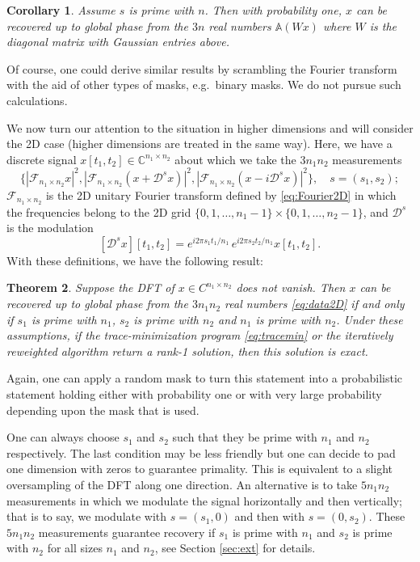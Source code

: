 \documentclass[11pt]{article}
\newtheorem{theorem}{Theorem}[section]
\newtheorem{corollary}[theorem]{Corollary}
\newcommand{\C}{\mathbb{C}}
\newcommand{\<}{\langle}
\renewcommand{\>}{\rangle}
\newcommand{\mapA}{\mathbb{A}}
\numberwithin{equation}{section}
\begin{document}
\begin{corollary}
  Assume $s$ is prime with $n$.  Then with probability one, $x$ can be
  recovered up to global phase from the $3n$ real numbers $\mapA(Wx)$
  where $W$ is the diagonal matrix with Gaussian entries above.
\end{corollary}
Of course, one could derive similar results by scrambling the Fourier
transform with the aid of other types of masks, e.g.~binary masks. We
do not pursue such calculations. 

\newcommand{\cF}{\mathcal{F}}

We now turn our attention to the situation in higher dimensions and
will consider the 2D case (higher dimensions are treated in the same
way). Here, we have a discrete signal $x[t_1, t_2] \in \C^{n_1 \times
  n_2}$ about which we take the $3n_1 n_2$ measurements
\begin{equation}
  \label{eq:data2D}
  \{|\cF_{n_1 \times n_2}  x|^2, |\cF_{n_1 \times n_2} (x + \mathcal{D}^s x)|^2, |\cF_{n_1 \times n_2} (x - i\mathcal{D}^s x)|^2\}, \quad s = (s_1, s_2); 
\end{equation}
$\cF_{n_1 \times n_2}$ is the 2D unitary Fourier transform defined by
\eqref{eq:Fourier2D} in which the frequencies belong to the 2D grid
$\{0, 1, \ldots, n_1 -1\} \times \{0, 1, \ldots, n_2 -1\}$, and
$\mathcal{D}^s$ is the modulation
$$
[\mathcal{D}^s x][t_1, t_2] = e^{i2\pi s_1 t_1/n_1} \, e^{i2\pi s_2
  t_2/n_1} x[t_1, t_2].
$$
With these definitions, we have the following result: 
\begin{theorem}
  \label{teo:2D}
  Suppose the DFT of $x \in C^{n_1 \times n_2}$ does not vanish. Then
  $x$ can be recovered up to global phase from the $3n_1 n_2$ real
  numbers \eqref{eq:data2D} if and only if $s_1$ is prime with $n_1$,
  $s_2$ is prime with $n_2$ and $n_1$ is prime with $n_2$. Under these
  assumptions, if the trace-minimization program \eqref{eq:tracemin}
  or the iteratively reweighted algorithm return a rank-1 solution,
  then this solution is exact.
\end{theorem}

Again, one can apply a random mask to turn this statement into a
probabilistic statement holding either with probability one or with
very large probability depending upon the mask that is used. 

One can always choose $s_1$ and $s_2$ such that they be prime with
$n_1$ and $n_2$ respectively. The last condition may be less friendly
but one can decide to pad one dimension with zeros to guarantee
primality. This is equivalent to a slight oversampling of the DFT
along one direction. An alternative is to take $5 n_1 n_2$
measurements in which we modulate the signal horizontally and then
vertically; that is to say, we modulate with $s = (s_1,0)$ and then
with $s = (0,s_2)$. These $5 n_1 n_2$ measurements guarantee recovery
if $s_1$ is prime with $n_1$ and $s_2$ is prime with $n_2$ for all
sizes $n_1$ and $n_2$, see Section \ref{sec:ext} for details.
\end{document}
